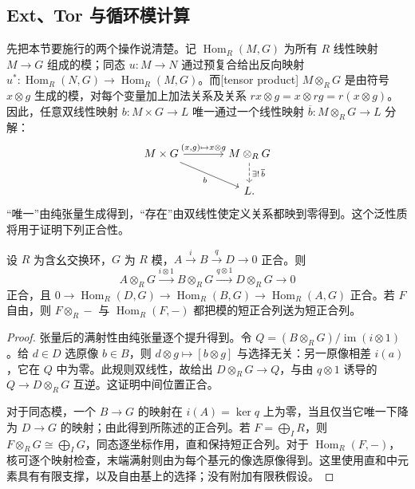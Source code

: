 \subsection{Ext、Tor 与循环模计算}
\label{g2:subsec:0401:02}
先把本节要施行的两个操作说清楚。记 \(\operatorname{Hom}_R(M,G)\) 为所有 \(R\) 线性映射 \(M\to G\) 组成的模；同态 \(u:M\to N\) 通过预复合给出反向映射 \(u^*:\operatorname{Hom}_R(N,G)\to\operatorname{Hom}_R(M,G)\)。而[tensor product] \(M\otimes_R G\) 是由符号 \(x\otimes g\) 生成的模，对每个变量加上加法关系及关系 \(rx\otimes g=x\otimes rg=r(x\otimes g)\)。因此，任意双线性映射 \(b:M\times G\to L\) 唯一通过一个线性映射 \(\overline b:M\otimes_R G\to L\) 分解：
\[
	\begin{tikzcd}[column sep=large]
		M\times G\arrow[r,"{(x,g)\mapsto x\otimes g}"]\arrow[dr,"b"'] & M\otimes_R G\arrow[d,dashed,"\exists!\,\overline b"] \\
		& L .
	\end{tikzcd}
\]
“唯一”由纯张量生成得到，“存在”由双线性使定义关系都映到零得到。这个泛性质将用于证明下列正合性。

\begin{proposition}\label{g2:prop:tensor-exactness}
	设 \(R\) 为含幺交换环，\(G\) 为 \(R\) 模，\(A\xrightarrow{i}B\xrightarrow{q}D\to0\) 正合。则
	\[
		A\otimes_R G\xrightarrow{i\otimes1}B\otimes_R G\xrightarrow{q\otimes1}D\otimes_R G\longrightarrow0
	\]
	正合，且 \(0\to\operatorname{Hom}_R(D,G)\to\operatorname{Hom}_R(B,G)\to\operatorname{Hom}_R(A,G)\) 正合。若 \(F\) 自由，则 \(F\otimes_R-\) 与 \(\operatorname{Hom}_R(F,-)\) 都把模的短正合列送为短正合列。
\end{proposition}
\begin{proof}
	张量后的满射性由纯张量逐个提升得到。令 \(Q=(B\otimes_R G)/\operatorname{im}(i\otimes1)\)。给 \(d\in D\) 选原像 \(b\in B\)，则 \(d\otimes g\mapsto[b\otimes g]\) 与选择无关：另一原像相差 \(i(a)\)，它在 \(Q\) 中为零。此规则双线性，故给出 \(D\otimes_R G\to Q\)，与由 \(q\otimes1\) 诱导的 \(Q\to D\otimes_R G\) 互逆。这证明中间位置正合。

	对于同态模，一个 \(B\to G\) 的映射在 \(i(A)=\ker q\) 上为零，当且仅当它唯一下降为 \(D\to G\) 的映射；由此得到所陈述的正合列。若 \(F=\bigoplus_I R\)，则 \(F\otimes_R G\cong\bigoplus_I G\)，同态逐坐标作用，直和保持短正合列。对于 \(\operatorname{Hom}_R(F,-)\)，核可逐个映射检查，末端满射则由为每个基元的像选原像得到。这里使用直和中元素具有有限支撑，以及自由基上的选择；没有附加有限秩假设。
\end{proof}

